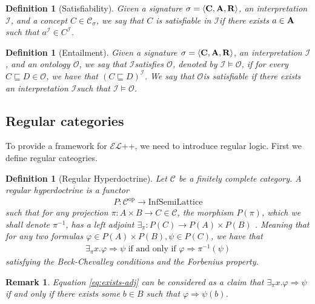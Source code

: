 \documentclass[12pt]{article}
\newtheorem{definition}[theorem]{Definition}
\newtheorem{remark}[theorem]{Remark}
\newcommand{\ELt}{$\mathcal{EL}$++}
\newcommand{\concepts}{{\bf C}}
\newcommand{\individuals}{{\bf A}}
\newcommand{\roles}{{\bf R}}
\newcommand{\tuple}[1]{\langle #1 \rangle}
\newcommand{\ontology}{\mathcal{O}}
\newcommand{\ontologyt}{$\mathcal{O}$}
\newcommand{\interpetation}{\mathcal{I}}
\newcommand{\interpetationt}{$\mathcal{I}$}
\newcommand{\InfSemiLattice}{\text{InfSemiLattice}}
\begin{document}
\begin{definition}[Satisfiability]
    Given a signature $\sigma=\tuple{\concepts, \individuals, \roles}$,
    an interpretation \interpetationt, and a concept $C\in\mathcal{C}_\sigma$,
    we say that $C$ is satisfiable in \interpetationt if there exists
    $a\in\individuals$ such that $a^\mathcal{I} \in C^\mathcal{I}$.
\end{definition}
\begin{definition}[Entailment]
    Given a signature $\sigma=\tuple{\concepts, \individuals, \roles}$,
    an interpretation \interpetationt, and an ontology \ontologyt,
    we say that \interpetationt satisfies \ontologyt, denoted by
    $\interpetation \models \ontology$, if for every $C\sqsubseteq D\in\ontology$,
    we have that $(C\sqsubseteq D)^\mathcal{I}$.
    We say that \ontologyt is satisfiable if there exists an interpretation
    \interpetationt such that $\interpetation \models \ontology$.
\end{definition}

\subsection{Regular categories}
To provide a framework for \ELt, we need to introduce regular logic.
First we define regular cateogries.

\begin{definition}[Regular Hyperdoctrine]
Let $\mathcal{C}$ be a finitely complete category.
A regular hyperdoctrine is
a functor
\begin{align*}
    P:\mathcal{C}^{\text{op}}\to \InfSemiLattice
\end{align*}
such that for any projection $\pi: A\times B\to C \in\mathcal{C}$,
the morphism $P(\pi)$, which we shall denote $\pi^{-1}$, has a left adjoint $\exists_\pi:P(C)\to P(A)\times P(B)$
 .
Meaning that for any two formulas $\varphi\in P(A)\times P(B),\psi\in P(C)$, we have that
\begin{gather}
    \exists_\pi x.\varphi\Rightarrow\psi\text{ if and only if }\varphi\Rightarrow\pi^{-1}(\psi)\label{eq:exists-adj}
\end{gather}
satisfying the Beck-Chevalley conditions and the Forbenius property.
\end{definition}
\begin{remark}
    Equation \ref*{eq:exists-adj} can be considered as a claim that $\exists_\pi x.\varphi\Rightarrow\psi$ if and only if there exists some $b\in B$
    such that $\varphi\Rightarrow\psi(b)$.
\end{remark}
\end{document}
